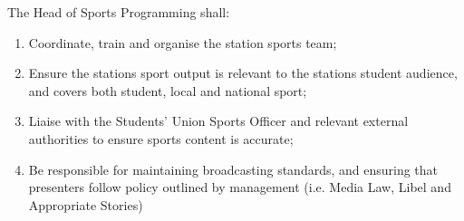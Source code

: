 \item The Head of Sports Programming shall:
\begin{enumerate}[label*=\arabic*.]
    \item Coordinate, train and organise the station sports team;
    \item Ensure the stations sport output is relevant to the stations student audience, and covers both student, local and national sport;
    \item Liaise with the Students' Union Sports Officer and relevant external authorities to ensure sports content is accurate;
    \item Be responsible for maintaining broadcasting standards, and ensuring that presenters follow policy outlined by management (i.e. Media Law, Libel and Appropriate Stories)
\end{enumerate}
